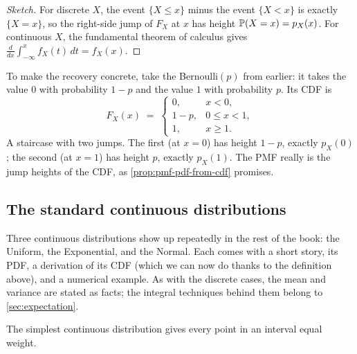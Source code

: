 \begin{proof}[Sketch]
For discrete $X$, the event $\{X \le x\}$ minus the event $\{X < x\}$ is exactly $\{X = x\}$, so the right-side jump of $F_X$ at $x$ has height $\mathbb{P}(X = x) = p_X(x)$. For continuous $X$, the fundamental theorem of calculus gives $\frac{d}{dx} \int_{-\infty}^{x} f_X(t)\, dt = f_X(x)$.
\end{proof}

To make the recovery concrete, take the Bernoulli$(p)$ from earlier: it takes the value $0$ with probability $1 - p$ and the value $1$ with probability $p$. Its CDF is
\[
F_X(x) \;=\; \begin{cases} 0, & x < 0, \\ 1 - p, & 0 \le x < 1, \\ 1, & x \ge 1. \end{cases}
\]
A staircase with two jumps. The first (at $x = 0$) has height $1 - p$, exactly $p_X(0)$; the second (at $x = 1$) has height $p$, exactly $p_X(1)$. The PMF really is the jump heights of the CDF, as \cref{prop:pmf-pdf-from-cdf} promises.


\subsection*{The standard continuous distributions}

Three continuous distributions show up repeatedly in the rest of the book: the Uniform, the Exponential, and the Normal. Each comes with a short story, its PDF, a derivation of its CDF (which we can now do thanks to the definition above), and a numerical example. As with the discrete cases, the mean and variance are stated as facts; the integral techniques behind them belong to \cref{sec:expectation}.



The simplest continuous distribution gives every point in an interval equal weight.

